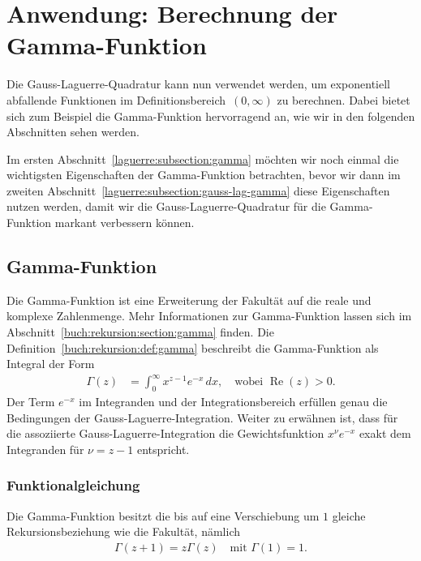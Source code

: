 %
%
%
\section{Anwendung: Berechnung der
  Gamma-Funktion%
  \label{laguerre:section:quad-gamma}}
%
Die Gauss-Laguerre-Quadratur kann nun verwendet werden,
um exponentiell abfallende Funktionen im Definitionsbereich~$(0, \infty)$
zu berechnen.
Dabei bietet sich zum Beispiel die Gamma-Funktion hervorragend an,
wie wir in den folgenden Abschnitten sehen werden.

Im ersten Abschnitt~\ref{laguerre:subsection:gamma} möchten wir noch einmal
die wichtigsten Eigenschaften der Gamma-Funktion betrachten,
bevor wir dann im zweiten Abschnitt~\ref{laguerre:subsection:gauss-lag-gamma}
diese Eigenschaften nutzen werden,
damit wir die Gauss-Laguerre-Quadratur für die Gamma-Funktion
markant verbessern können.

\subsection{Gamma-Funktion%
\label{laguerre:subsection:gamma}}
Die Gamma-Funktion ist eine Erweiterung der Fakultät auf die reale und komplexe
%
%
Zahlenmenge.
Mehr Informationen zur Gamma-Funktion lassen sich im
Abschnitt~\ref{buch:rekursion:section:gamma} finden.
Die Definition~\ref{buch:rekursion:def:gamma} beschreibt die Gamma-Funktion als
Integral der Form
\begin{align}
\Gamma(z)
 & =
\int_0^\infty x^{z-1} e^{-x} \, dx
,
\quad
\text{wobei } \operatorname{Re}(z) > 0
\label{laguerre:gamma}
.
\end{align}
Der Term $e^{-x}$ im Integranden und der Integrationsbereich erfüllen
genau die Bedingungen der Gauss-Laguerre-Integration.
Weiter zu erwähnen ist, dass für die assoziierte Gauss-Laguerre-Integration die
Gewichtsfunktion $x^\nu e^{-x}$  exakt dem Integranden
für $\nu = z - 1$ entspricht.

\subsubsection{Funktionalgleichung}
Die Gamma-Funktion besitzt die bis auf eine Verschiebung um $1$ gleiche
Rekursionsbeziehung wie die Fakultät,
%
nämlich
\begin{align}
\Gamma(z+1)
=
z \Gamma(z)
\quad
\text{mit }
\Gamma(1)
=
1
.
\label{laguerre:gamma_funktional}
\end{align}

